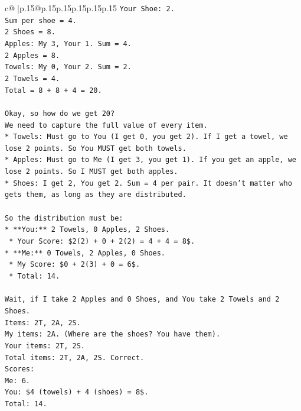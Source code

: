 \documentclass{article}
\begin{document}
{\begin{supertabular}{c@{$\;$}|p{.15\linewidth}@{}p{.15\linewidth}p{.15\linewidth}p{.15\linewidth}p{.15\linewidth}p{.15\linewidth}}
{{{\texttt{Your Shoe: 2.} \\
\texttt{Sum per shoe = 4.} \\
\texttt{2 Shoes = 8.} \\
\texttt{Apples: My 3, Your 1. Sum = 4.} \\
\texttt{2 Apples = 8.} \\
\texttt{Towels: My 0, Your 2. Sum = 2.} \\
\texttt{2 Towels = 4.} \\
\texttt{Total = 8 + 8 + 4 = 20.} \\
\\ 
\texttt{Okay, so how do we get 20?} \\
\texttt{We need to capture the full value of every item.} \\
\texttt{*   Towels: Must go to You (I get 0, you get 2). If I get a towel, we lose 2 points. So You MUST get both towels.} \\
\texttt{*   Apples: Must go to Me (I get 3, you get 1). If you get an apple, we lose 2 points. So I MUST get both apples.} \\
\texttt{*   Shoes: I get 2, You get 2. Sum = 4 per pair. It doesn't matter who gets them, as long as they are distributed.} \\
\\ 
\texttt{So the distribution must be:} \\
\texttt{*   **You:** 2 Towels, 0 Apples, 2 Shoes.} \\
\texttt{    *   Your Score: \$2(2) + 0 + 2(2) = 4 + 4 = 8\$.} \\
\texttt{*   **Me:** 0 Towels, 2 Apples, 0 Shoes.} \\
\texttt{    *   My Score: \$0 + 2(3) + 0 = 6\$.} \\
\texttt{    *   Total: 14.} \\
\\ 
\texttt{Wait, if I take 2 Apples and 0 Shoes, and You take 2 Towels and 2 Shoes.} \\
\texttt{Items: 2T, 2A, 2S.} \\
\texttt{My items: 2A. (Where are the shoes? You have them).} \\
\texttt{Your items: 2T, 2S.} \\
\texttt{Total items: 2T, 2A, 2S. Correct.} \\
\texttt{Scores:} \\
\texttt{Me: 6.} \\
\texttt{You: \$4 (towels) + 4 (shoes) = 8\$.} \\
\texttt{Total: 14.} \\
}}}
\end{supertabular}}
\end{document}
